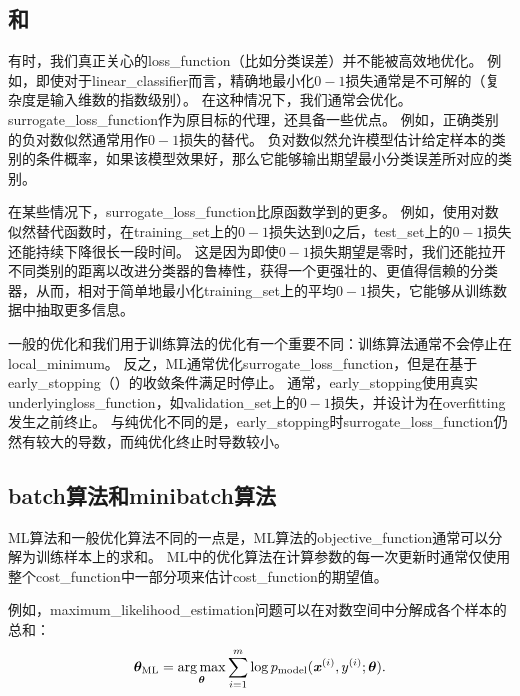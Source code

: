 \subsection{和}
\label{sec:surrogate_loss_functions_and_early_stopping}
有时，我们真正关心的\gls{loss_function}（比如分类误差）并不能被高效地优化。
例如，即使对于\gls{linear_classifier}而言，精确地最小化$0-1$损失通常是不可解的（复杂度是输入维数的指数级别）\citep{Marcotte-92}。
在这种情况下，我们通常会优化。
\gls{surrogate_loss_function}作为原目标的代理，还具备一些优点。  
例如，正确类别的负对数似然通常用作$0-1$损失的替代。
负对数似然允许模型估计给定样本的类别的条件概率，如果该模型效果好，那么它能够输出期望最小分类误差所对应的类别。


在某些情况下，\gls{surrogate_loss_function}比原函数学到的更多。
例如，使用对数似然替代函数时，在\gls{training_set}上的$0-1$损失达到$0$之后，\gls{test_set}上的$0-1$损失还能持续下降很长一段时间。
这是因为即使$0-1$损失期望是零时，我们还能拉开不同类别的距离以改进分类器的鲁棒性，获得一个更强壮的、更值得信赖的分类器，从而，相对于简单地最小化\gls{training_set}上的平均$0-1$损失，它能够从训练数据中抽取更多信息。


一般的优化和我们用于训练算法的优化有一个重要不同：训练算法通常不会停止在\gls{local_minimum}。
反之，\gls{ML}通常优化\gls{surrogate_loss_function}，但是在基于\gls{early_stopping}（）的收敛条件满足时停止。
通常，\gls{early_stopping}使用真实\gls{underlying}\gls{loss_function}，如\gls{validation_set}上的$0-1$损失，并设计为在\gls{overfitting}发生之前终止。
与纯优化不同的是，\gls{early_stopping}时\gls{surrogate_loss_function}仍然有较大的导数，而纯优化终止时导数较小。


\subsection{\gls{batch}算法和\gls{minibatch}算法}
\label{sec:batch_and_minibatch_algorithms}
\gls{ML}算法和一般优化算法不同的一点是，\gls{ML}算法的\gls{objective_function}通常可以分解为训练样本上的求和。
\gls{ML}中的优化算法在计算参数的每一次更新时通常仅使用整个\gls{cost_function}中一部分项来估计\gls{cost_function}的期望值。

例如，\gls{maximum_likelihood_estimation}问题可以在对数空间中分解成各个样本的总和：
\begin{equation}
\label{eq:8.4}
    \boldsymbol{\theta}_{\text{ML}} = \underset{\boldsymbol{\theta}}{\arg\max} \sum_{i=1}^m
    \log p_{\text{model}} (\boldsymbol{\mathit{x}}^{(i)}, y^{(i)}; \boldsymbol{\theta}) .
\end{equation}


